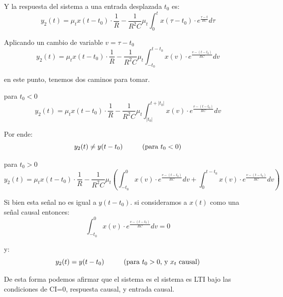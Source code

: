 \documentclass[12pt,a4paper]{report}
\begin{document}
\begin{enumerate}[label=\alph*)]
      Y la respuesta del sistema a una entrada desplazada $t_0$ es:
      $$y_2(t) = \mu_t x(t-t_0) \cdot \frac{1}{R}- \frac{1}{R^2C} \mu_t \int_{0}^{t} x(\tau - t_0) \cdot
      e^{\frac{\tau-t}{RC}} d\tau$$

      Aplicando un cambio de variable $v= \tau-t_0$
      $$y_2(t) = \mu_t x(t-t_0) \cdot \frac{1}{R}- \frac{1}{R^2C} \mu_t \int_{-t_0}^{t-t_0} x(v) \cdot
      e^{\frac{v-(t-t_0)}{RC}} dv$$

      en este punto, tenemos dos caminos para tomar.

      para $t_0 < 0$
      $$y_2(t) = \mu_t x(t-t_0) \cdot \frac{1}{R}- \frac{1}{R^2C} \mu_t \int_{|t_0|}^{t+|t_0|} x(v) \cdot
      e^{\frac{v-(t-t_0)}{RC}} dv$$

      Por ende:
      $$y_2(t) \neq y(t-t_0) \hspace{10mm} (\text{para }t_0<0)$$

      para $t_0 > 0$
      $$y_2(t) = \mu_t x(t-t_0) \cdot \frac{1}{R}- \frac{1}{R^2C} \mu_t \left( \int_{-t_0}^{0} x(v) \cdot 
      e^{\frac{v-(t-t_0)}{RC}} dv +\int_{0}^{t-t_0} x(v) \cdot e^{\frac{v-(t-t_0)}{RC}} dv \right)$$

      Si bien esta señal no es igual a $y(t-t_0)$. si consideramos a $x(t)$ como una señal causal entonces:
      $$\int_{-t_0}^{0} x(v) \cdot e^{\frac{v-(t-t_0)}{RC}} dv = 0$$

      y:
      $$y_2(t) = y(t-t_0) \hspace{10mm} (\text{para }t_0>0 \text{, y } x_t \text{ causal})$$

      De esta forma podemos afirmar que el sistema es el sistema es LTI bajo las condiciones de CI=0, respuesta causal,
      y entrada causal.



\end{enumerate}
\end{document}

